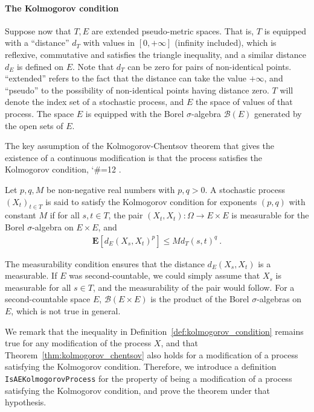 \documentclass[lean]{Draft}
\makeatletter
\newcommand\leanlink{\begingroup\catcode`\#=12\relax\@leanlink}
\newcommand\@leanlink[2]{\endgroup
\href{#1}
{\texttt{\detokenize{#2}}}}
\newcommand{\docs}[1]{%
\leanlink{https://remydegenne.github.io/brownian-motion/docs/find/?pattern=#1\#doc}
{#1}}
\makeatother
\begin{document}
\paragraph{The Kolmogorov condition}

Suppose now that $T, E$ are extended pseudo-metric spaces.
That is, $T$ is equipped with a ``distance'' $d_T$ with values in $[0,+\infty]$ (infinity included), which is reflexive, commutative and satisfies the triangle inequality, and a similar distance $d_E$ is defined on $E$. Note that $d_T$ can be zero for pairs of non-identical points.
``extended'' refers to the fact that the distance can take the value $+\infty$, and ``pseudo'' to the possibility of non-identical points having distance zero.
$T$ will denote the index set of a stochastic process, and $E$ the space of values of that process.
The space $E$ is equipped with the Borel $\sigma$-algebra $\mathcal{B}(E)$ generated by the open sets of $E$.

The key assumption of the Kolmogorov-Chentsov theorem that gives the existence of a continuous modification is that the process satisfies the Kolmogorov condition, \docs{ProbabilityTheory.IsKolmogorovProcess}.

\begin{definition}\label{def:kolmogorov_condition}
Let $p, q, M$ be non-negative real numbers with $p,q>0$.
A stochastic process $(X_t)_{t \in T}$ is said to satisfy the Kolmogorov condition for exponents $(p, q)$ with constant $M$ if for all $s, t \in T$, the pair $(X_t, X_t) : \Omega \to E \times E$ is measurable for the Borel $\sigma$-algebra on $E \times E$, and
\begin{align*}
  \mathbf{E}[d_E(X_s, X_t)^p] \le M d_T(s, t)^q
  \: .
\end{align*}
\end{definition}

The measurability condition ensures that the distance $d_E(X_s, X_t)$ is a measurable.
If $E$ was second-countable, we could simply assume that $X_s$ is measurable for all $s \in T$, and the measurability of the pair would follow.
For a second-countable space $E$, $\mathcal{B}(E \times E)$ is the product of the Borel $\sigma$-algebras on $E$, which is not true in general.

We remark that the inequality in Definition~\ref{def:kolmogorov_condition} remains true for any modification of the process $X$, and that Theorem~\ref{thm:kolmogorov_chentsov} also holds for a modification of a process satisfying the Kolmogorov condition.
Therefore, we introduce a definition \lstinline|IsAEKolmogorovProcess| for the property of being a modification of a process satisfying the Kolmogorov condition, and prove the theorem under that hypothesis.
\end{document}
